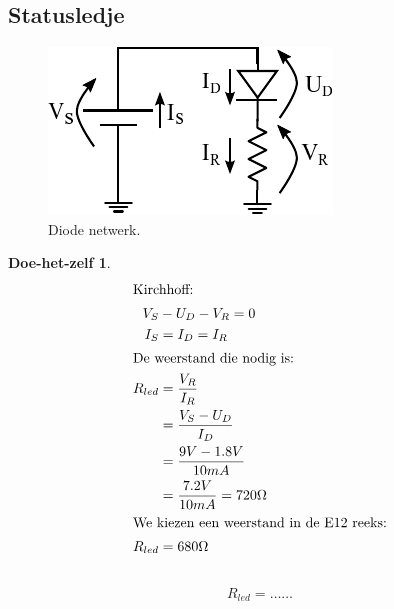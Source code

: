\documentclass{article}
\newtheorem{DIY}{Doe-het-zelf}
\begin{document}
\subsection{Statusledje}
			\begin{figure}[htbp]
				\centering
				\includegraphics{diode_netwerk}
				\caption{Diode netwerk.}
				\label{fig:diode_netwerk}
			\end{figure}

			\begin{DIY} 

			\ifoplossing
				\begin{align*}
				\intertext{Kirchhoff:}
					V_S &- U_D - V_R = 0 \\
					I_S &= I_D = I_R \\
				\intertext{De weerstand die nodig is:}	
				    R_{led} &= \frac{V_R}{I_R} \\
				    		&= \frac{V_S-U_D}{I_D} \\
				    		&= \frac{9V-1.8V}{10mA} \\
				    		&= \frac{7.2V}{10mA} = 720 \Omega \\
				\intertext{We kiezen een weerstand in de E12 reeks:}
				    R_{led} &= 680 \Omega
				\end{align*}
			\else
				~\vspace*{20ex}
				\begin{align*}
				    R_{led} = \ldots\ldots
				\end{align*}
			\fi

			\end{DIY}
\end{document}
